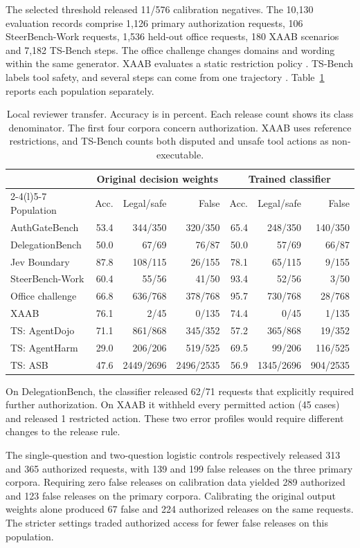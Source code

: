 The selected threshold released 11/576 calibration negatives. The 10,130 evaluation records comprise 1,126 primary authorization requests, 106 SteerBench-Work requests, 1,536 held-out office requests, 180 XAAB scenarios and 7,182 TS-Bench steps. The office challenge changes domains and wording within the same generator. XAAB evaluates a static restriction policy \cite{xaab}. TS-Bench labels tool safety, and several steps can come from one trajectory \cite{toolsafe}. Table~\ref{tab:readout-transfer} reports each population separately.

\begin{table}[!htbp]\centering\small
\caption{Local reviewer transfer. Accuracy is in percent. Each release count shows its class denominator. The first four corpora concern authorization. XAAB uses reference restrictions, and TS-Bench counts both disputed and unsafe tool actions as non-executable.}
\label{tab:readout-transfer}
\begin{tabular}{@{}lrrr@{\hskip 1.2em}rrr@{}}\toprule
& \multicolumn{3}{c}{Original decision weights} & \multicolumn{3}{c}{Trained classifier}\\
\cmidrule(lr){2-4}\cmidrule(l){5-7}
Population & Acc. & Legal/safe & False & Acc. & Legal/safe & False \\ \midrule
AuthGateBench & 53.4 & 344/350 & 320/350 & 65.4 & 248/350 & 140/350 \\
DelegationBench & 50.0 & 67/69 & 76/87 & 50.0 & 57/69 & 66/87 \\
Jev Boundary & 87.8 & 108/115 & 26/155 & 78.1 & 65/115 & 9/155 \\
\midrule
SteerBench-Work & 60.4 & 55/56 & 41/50 & 93.4 & 52/56 & 3/50 \\
\midrule
Office challenge & 66.8 & 636/768 & 378/768 & 95.7 & 730/768 & 28/768 \\
XAAB & 76.1 & 2/45 & 0/135 & 74.4 & 0/45 & 1/135 \\
\midrule
TS: AgentDojo & 71.1 & 861/868 & 345/352 & 57.2 & 365/868 & 19/352 \\
TS: AgentHarm & 29.0 & 206/206 & 519/525 & 69.5 & 99/206 & 116/525 \\
TS: ASB & 47.6 & 2449/2696 & 2496/2535 & 56.9 & 1345/2696 & 904/2535 \\
\bottomrule\end{tabular}
\end{table}

On DelegationBench, the classifier released 62/71 requests that explicitly required further authorization. On XAAB it withheld every permitted action (45 cases) and released 1 restricted action. These two error profiles would require different changes to the release rule.

The single-question and two-question logistic controls respectively released 313 and 365 authorized requests, with 139 and 199 false releases on the three primary corpora. Requiring zero false releases on calibration data yielded 289 authorized and 123 false releases on the primary corpora. Calibrating the original output weights alone produced 67 false and 224 authorized releases on the same requests. The stricter settings traded authorized access for fewer false releases on this population.
